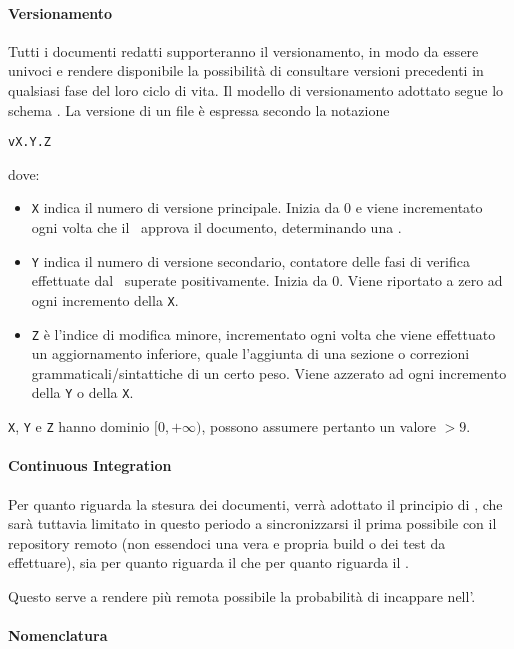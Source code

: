 			\paragraph{Versionamento} \label{Versionamento}
			Tutti i documenti redatti supporteranno il versionamento, in modo da essere univoci e rendere disponibile la possibilità di consultare versioni precedenti
			in qualsiasi fase del loro ciclo di vita.
			Il modello di versionamento adottato segue lo schema . La versione di un file è espressa secondo la notazione
			\begin{center}
				\texttt{vX.Y.Z}
			\end{center}
			\indent dove:
			\begin{itemize}
				\item \texttt{X} indica il numero di versione principale. Inizia da 0 e viene incrementato ogni volta che il \Res\ approva il documento, determinando
					una .
				\item \texttt{Y} indica il numero di versione secondario, contatore delle fasi di verifica effettuate dal \Ver\ superate positivamente. Inizia da 0. Viene riportato a zero ad
					ogni incremento della \texttt{X}.
				\item \texttt{Z} è l'indice di modifica minore, incrementato ogni volta che viene effettuato un aggiornamento inferiore, quale l'aggiunta di una sezione
					o correzioni grammaticali/sintattiche di un certo peso. Viene azzerato ad ogni incremento della \texttt{Y} o della \texttt{X}.
			\end{itemize}

			\texttt{X}, \texttt{Y} e \texttt{Z} hanno dominio $[0,+\infty)$, possono assumere pertanto un valore $> 9$.

			\paragraph{Continuous Integration}
			Per quanto riguarda la stesura dei documenti, verrà adottato il principio di , che sarà tuttavia limitato in questo periodo
			a sincronizzarsi il prima possibile con il repository remoto (non essendoci
			una vera e propria build o dei test da effettuare), sia per quanto riguarda il  che per quanto riguarda il .

			Questo serve a rendere più remota possibile la probabilità di incappare nell'.


			\paragraph{Nomenclatura}

